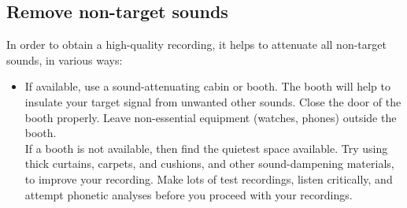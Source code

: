 \documentclass[
]{book}
\begin{document}
\protect{}\label{recording}
\subsection{Remove non-target sounds}\label{sec:removenontargetsounds}

In order to obtain a high-quality recording, it helps to attenuate all non-target sounds, in various ways:

\begin{itemize}
\item
  If available, use a sound-attenuating cabin or booth. The booth will help to insulate your target signal from unwanted other sounds. Close the door of the booth properly. Leave non-essential equipment (watches, phones) outside the booth.\\
  If a booth is not available, then find the quietest space available. Try using thick curtains, carpets, and cushions, and other sound-dampening materials, to improve your recording. Make lots of test recordings, listen critically, and attempt phonetic analyses before you proceed with your recordings.


\end{itemize}
\end{document}
